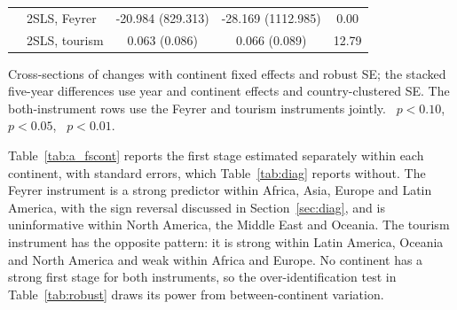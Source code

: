 \begin{table}[H]
\begin{threeparttable}
\begin{tabular}{llccc}
 & 2SLS, Feyrer & -20.984 (829.313) & -28.169 (1112.985) & 0.00 \\
 & 2SLS, tourism & 0.063 (0.086) & 0.066 (0.089) & 12.79 \\
\bottomrule
\end{tabular}
\begin{tablenotes}\footnotesize\item Cross-sections of changes with continent fixed effects and robust SE; the stacked five-year differences use year and continent effects and country-clustered SE. The both-instrument rows use the Feyrer and tourism instruments jointly. \sym{*}~$p<0.10$, \sym{**}~$p<0.05$, \sym{***}~$p<0.01$.\end{tablenotes}\end{threeparttable}\end{table}

Table~\ref{tab:a_fscont} reports the first stage estimated separately within each continent, with standard errors, which Table~\ref{tab:diag} reports without. The Feyrer instrument is a strong predictor within Africa, Asia, Europe and Latin America, with the sign reversal discussed in Section~\ref{sec:diag}, and is uninformative within North America, the Middle East and Oceania. The tourism instrument has the opposite pattern: it is strong within Latin America, Oceania and North America and weak within Africa and Europe. No continent has a strong first stage for both instruments, so the over-identification test in Table~\ref{tab:robust} draws its power from between-continent variation.

